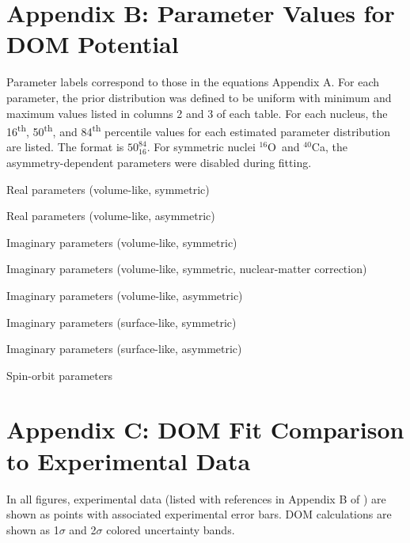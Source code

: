 \documentclass[twocolumn,secnumarabic,amssymb, nobibnotes, aps, prl,
superscriptaddress, nobalancelastpage, draft]{revtex4}
\newcommand{\oSix}{\ensuremath{^{16}}O}
\newcommand{\caForty}{\ensuremath{^{40}}C\lowercase{a}}
\begin{document}
\clearpage
\onecolumngrid
\appendix \label{DOMParameterValues}
\section{Appendix B: Parameter Values for DOM Potential}
Parameter labels correspond to those in the equations Appendix A. 
For each parameter, the prior distribution was defined to be uniform with minimum and maximum values
listed in columns 2 and 3 of each table. For each nucleus, the
16\textsuperscript{th}, 50\textsuperscript{th}, and
84\textsuperscript{th} percentile values for each estimated parameter
distribution are listed. The format is $\text{50}^{\text{84}}_{\text{16}}$.
For symmetric nuclei \oSix\ and \caForty, the asymmetry-dependent parameters were disabled during fitting.
\begin{table}[htbp]
    \footnotesize
    \caption{Real parameters (volume-like, symmetric)}
    
    \caption{Real parameters (volume-like, asymmetric)}
    
    \caption{Imaginary parameters (volume-like, symmetric)}
    
    \caption{Imaginary parameters (volume-like, symmetric, nuclear-matter correction)}
    
    \caption{Imaginary parameters (volume-like, asymmetric)}
    
\end{table}
\clearpage
\begin{table}[htbp!]
    \footnotesize
    \caption{Imaginary parameters (surface-like, symmetric)}
    
    \vspace{0.3em}
    \caption{Imaginary parameters (surface-like, asymmetric)}
    
    \vspace{0.3em}
    \caption{Spin-orbit parameters}
    
\end{table}
\appendix \label{DOMFitResults}
\section{Appendix C: DOM Fit Comparison to Experimental Data}
In all figures, experimental data
(listed with references in Appendix B of \cite{PruittPhDThesis}) are shown
as points with associated experimental error bars. DOM calculations are shown as
1$\sigma$ and 2$\sigma$ colored uncertainty bands. 
\end{document}

